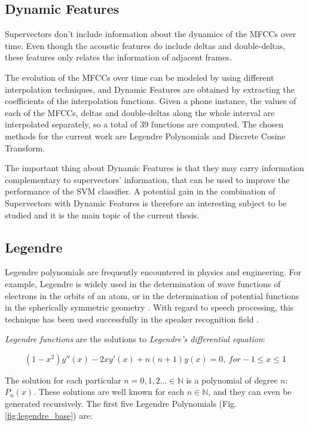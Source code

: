 \subsection{Dynamic Features}

Supervectors don't include information about the dynamics of the MFCCs over time. Even though
the acoustic features do include deltas and double-deltas, these features only relates the
information of adjacent frames.

The evolution of the MFCCs over time can be modeled by using different interpolation techniques,
and Dynamic Features are obtained by extracting the coefficients of the interpolation functions.
Given a phone instance,
the values of each of the MFCCs, deltas and double-deltas along the whole interval are
interpolated separately, so a total of 39 functions are computed.
The chosen methods for the current work are Legendre Polynomials and Discrete Cosine Transform.

The important thing about Dynamic Features is that they
may carry information complementary to supervectors' information, that can be used to improve
the performance of the SVM classifier. A potential gain in the combination
of Supervectors with Dynamic Features is therefore an interesting
subject to be studied and it is the main topic of the current thesis.

\subsection{Legendre}

Legendre polynomials are frequently encountered in physics and engineering.
For example, Legendre is widely used in the determination of wave
functions of electrons in the orbits of an atom, or in the determination of potential
functions in the spherically symmetric geometry \cite{legendre_usage}.
With regard to speech processing,
this technique has been used successfully
in the speaker recognition field \cite{legendre}.

\textit{Legendre functions} are the solutions to \textit{Legendre's differential equation}:

\begin{equation}
(1-x^{2})y''(x)-2xy'(x)+n(n+1)y(x)=0, \ for -1 \leq x \leq 1
\end{equation}

The solution for each particular $n={0, 1, 2 \dotsc} \in \mathbb{N}$ is a polynomial of degree
$n$: $P_{n}(x)$. These solutions are well known for each $n \in \mathbb{N}$, and they can even
be generated recursively. The first five Legendre Polynomials (Fig. \ref{fig:legendre_base}) are:

